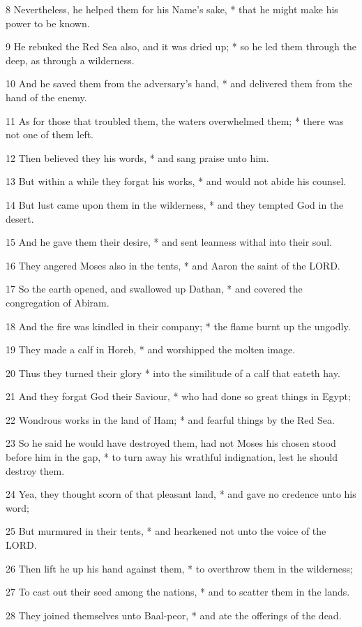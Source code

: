 8 Nevertheless, he helped them for his Name's sake,
* that he might make his power to be known.

9 He rebuked the Red Sea also, and it was dried up;
* so he led them through the deep, as through a wilderness.

10 And he saved them from the adversary's hand, * and
delivered them from the hand of the enemy.

11 As for those that troubled them, the waters overwhelmed
them; * there was not one of them left.

12 Then believed they his words, * and sang praise
unto him.

13 But within a while they forgat his works, * and
would not abide his counsel.

14 But lust came upon them in the wilderness, * and
they tempted God in the desert.

15 And he gave them their desire, * and sent leanness
withal into their soul.

16 They angered Moses also in the tents, * and Aaron
the saint of the LORD.

17 So the earth opened, and swallowed up Dathan, *
and covered the congregation of Abiram.

18 And the fire was kindled in their company; * the
flame burnt up the ungodly.

19 They made a calf in Horeb, * and worshipped the
molten image.

20 Thus they turned their glory * into the similitude
of a calf that eateth hay.

21 And they forgat God their Saviour, * who had done
so great things in Egypt;

22 Wondrous works in the land of Ham; * and fearful
things by the Red Sea.

23 So he said he would have destroyed them, had not
Moses his chosen stood before him in the gap, * to turn away his wrathful
indignation, lest he should destroy them.

24 Yea, they thought scorn of that pleasant land, *
and gave no credence unto his word;

25 But murmured in their tents, * and hearkened not
unto the voice of the LORD.

26 Then lift he up his hand against them, * to overthrow
them in the wilderness;

27 To cast out their seed among the nations, * and
to scatter them in the lands.

28 They joined themselves unto Baal-peor, * and ate
the offerings of the dead.

